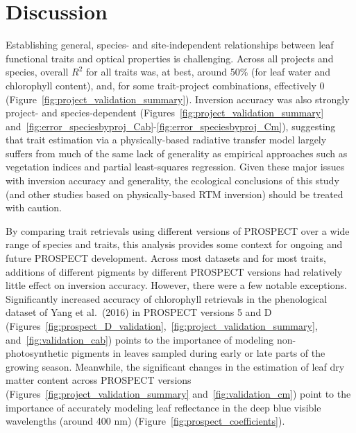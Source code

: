 \section{Discussion}

Establishing general, species- and site-independent relationships between leaf functional traits and optical properties is challenging.
Across all projects and species, overall $R^2$ for all traits was, at best, around 50\% (for leaf water and chlorophyll content), and, for some trait-project combinations, effectively 0 (Figure~\ref{fig:project_validation_summary}).
Inversion accuracy was also strongly project- and species-dependent (Figures~\ref{fig:project_validation_summary} and~\ref{fig:error_speciesbyproj_Cab}-\ref{fig:error_speciesbyproj_Cm}), suggesting that trait estimation via a physically-based radiative transfer model largely suffers from much of the same lack of generality as empirical approaches such as vegetation indices and partial least-squares regression.
Given these major issues with inversion accuracy and generality, the ecological conclusions of this study (and other studies based on physically-based RTM inversion) should be treated with caution.

By comparing trait retrievals using different versions of PROSPECT over a wide range of species and traits, this analysis provides some context for ongoing and future PROSPECT development.
Across most datasets and for most traits, additions of different pigments by different PROSPECT versions had relatively little effect on inversion accuracy.
However, there were a few notable exceptions.
Significantly increased accuracy of chlorophyll retrievals in the phenological dataset of Yang et al.~(2016) \nocite{yang_2016_seasonal} in PROSPECT versions 5 and D (Figures~\ref{fig:prospect_D_validation},~\ref{fig:project_validation_summary}, and~\ref{fig:validation_cab}) points to the importance of modeling non-photosynthetic pigments in leaves sampled during early or late parts of the growing season.
Meanwhile, the significant changes in the estimation of leaf dry matter content across PROSPECT versions (Figures~\ref{fig:project_validation_summary} and~\ref{fig:validation_cm}) point to the importance of accurately modeling leaf reflectance in the deep blue visible wavelengths (around 400 nm) (Figure~\ref{fig:prospect_coefficients}).

